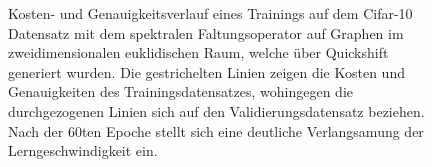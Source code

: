 \begin{figure}[t]
\caption[\gls{Cifar}-10 Kosten- und Genauigkeitsverlauf]{Kosten- und Genauigkeitsverlauf eines Trainings auf dem \gls{Cifar}-10 Datensatz mit dem spektralen Faltungsoperator auf Graphen im zweidimensionalen euklidischen Raum, welche über Quickshift generiert wurden.
Die gestrichelten Linien zeigen die Kosten und Genauigkeiten des Trainingsdatensatzes, wohingegen die durchgezogenen Linien sich auf den Validierungsdatensatz beziehen.
Nach der $60$ten Epoche stellt sich eine deutliche Verlangsamung der Lerngeschwindigkeit ein.}
\label{fig:cifar_10_train}
\end{figure}

